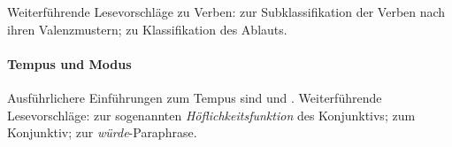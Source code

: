 \begin{sloppypar}
Weiterführende Lesevorschläge zu Verben:
\citet{HS91} zur Subklassifikation der Verben nach ihren Valenzmustern;
\citet{Wiese08} zu Klassifikation des Ablauts.

\paragraph*{Tempus und Modus}

Ausführlichere Einführungen zum Tempus sind \citet{Rothstein2007} und \citet{Vater2007}.
Weiterführende Lesevorschläge:
\citet{Leibukt2011} zur sogenannten \textit{Höflichkeitsfunktion} des Konjunktivs;
\citet{Fabricius1997} zum Konjunktiv;
\citet{Fabricius2000} zur \textit{würde}-Paraphrase.

\end{sloppypar}
